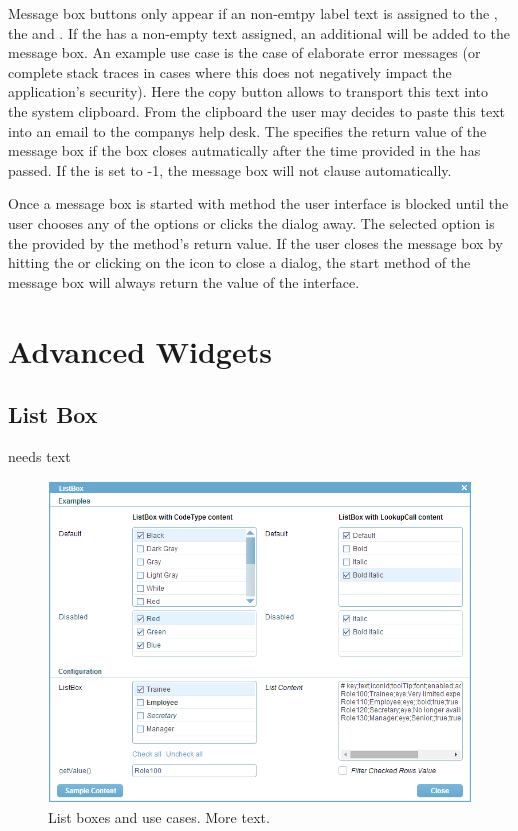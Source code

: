 \documentclass[a4paper,10pt,twoside]{book}
\begin{document}
{Message box buttons only appear if an non-emtpy label text is assigned to the , the  and . 
If the  has a non-empty text assigned, an additional  will be added to the message box. 
An example use case is the case of elaborate error messages (or complete stack traces in cases where this does not negatively impact the application's security). 
Here the copy button allows to transport this text into the system clipboard. 
From the clipboard the user may decides to paste this text into an email to the companys help desk. 
The  specifies the return value of the message box if the box closes autmatically after the time provided in the  has passed. 
If the  is set to -1, the message box will not clause automatically. 

Once a message box is started with method  the user interface is blocked until the user chooses any of the options or clicks the dialog away. 
The selected option is the provided by the method's return value. 
If the user closes the message box by hitting the  or clicking on the icon to close a dialog, the start method of the message box will always return the value  of the  interface.

\chapter{Advanced Widgets}

\section{List Box}
needs text

\begin{figure}
\includegraphics[width=14cm]{listbox.png}
\caption{List boxes and use cases.
More text.}
\end{figure}

}
\end{document}
